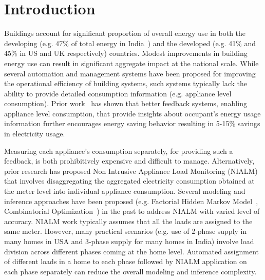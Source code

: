 \documentclass[conference]{IEEEtran}
\begin{document}
\section{Introduction}
\noindent Buildings account for significant proportion of overall energy use in both the developing (e.g. 47\% of total energy in India~\cite{evans09}) and the developed (e.g. 41\% and 45\% in US and UK respectively) countries. Modest improvements in building energy use can result in significant aggregate impact at the national scale. While several automation and management systems have been proposed for improving the operational efficiency of building systems, such systems typically lack the ability to provide detailed consumption information (e.g. appliance level consumption). Prior work~\cite{darby} has shown that better feedback systems, enabling appliance level consumption, that provide insights about occupant's energy usage information further encourages energy saving behavior resulting in 5-15\% savings in electricity usage.

\noindent Measuring each appliance's consumption separately, for providing such a feedback, is both prohibitively expensive and difficult to manage. Alternatively, prior research has proposed Non Intrusive Appliance Load Monitoring (NIALM) that involves disaggregating the aggregated electricity consumption obtained at the meter level into individual appliance consumption. Several modeling and inference approaches have been proposed (e.g. Factorial Hidden Markov Model~\cite{Ghahramani_97a}, Combinatorial Optimization~\cite{hart}) in the past to address NIALM with varied level of accuracy. NIALM work typically assumes that all the loads are assigned to the same meter. However, many practical scenarios (e.g. use of 2-phase supply in many homes in USA and 3-phase supply for many homes in India) involve load division across different phases coming at the home level. Automated assignment of different loads in a home to each phase followed by NIALM application on each phase separately can reduce the overall modeling and inference complexity. 
\end{document}
